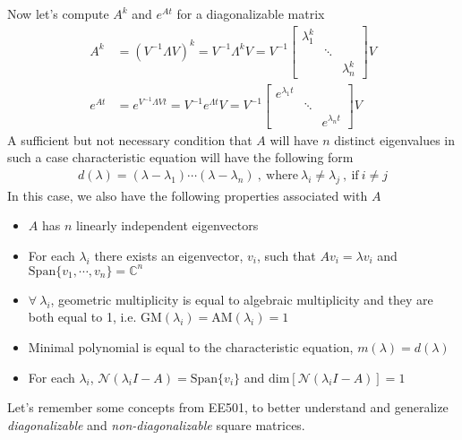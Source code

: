 \documentclass[twoside]{article}
\begin{document}
Now let's compute $A^k$ and $e^{At}$ for a diagonalizable matrix 
%
\begin{align*}
A^k &= \left(V^{-1} \Lambda V \right)^k  = V^{-1} \Lambda^k V = V^{-1} \left[ \begin{array}{ccc} \lambda_1^k &  &   \\   &  \ddots & \\ & & \lambda_n^k \end{array} \right] V
\\
e^{A t} &= e^{V^{-1} \Lambda V t}  = V^{-1} e^{ \Lambda t} V = V^{-1} \left[ \begin{array}{ccc} e^{\lambda_1 t} &  &   \\   &  \ddots & \\ & & e^{\lambda_n t} \end{array} \right] V  
\end{align*}
%
A sufficient but not necessary condition that $A$ will have $n$ distinct eigenvalues in such a case characteristic equation will have the following form
%
\begin{align*}
d(\lambda) = (\lambda - \lambda_1) \cdots (\lambda - \lambda_n) \ , \ \mathrm{where} \ \lambda_i \neq \lambda_j \ , \ \mathrm{if} \ i \neq j 
\end{align*}
% 
In this case, we also have the following properties associated with $A$
%
\begin{itemize}
	\item $A$ has $n$ linearly independent eigenvectors
	\item For each $\lambda_i$ there exists an eigenvector, $v_i$, such that $A v_i = \lambda v_i$ and $\mathrm{Span}\lbrace v_1 , \cdots , v_n \rbrace = \mathbb{C}^n$
	\item $\forall \ \lambda_i$, geometric multiplicity is equal to algebraic multiplicity and they are both equal to 1, i.e. $\mathrm{GM}(\lambda_i) = \mathrm{AM}(\lambda_i) = 1$
	\item Minimal polynomial is equal to the characteristic equation, $m(\lambda) = d(\lambda)$
	\item For each $\lambda_i$, $\mathcal{N}(\lambda_i I - A) = \mathrm{Span} \lbrace v_i \rbrace $ and $ \mathrm{dim} [ \mathcal{N}(\lambda_i I - A) ] = 1$
\end{itemize}
%
Let's remember some concepts from EE501, to better understand and generalize \textit{diagonalizable} and \textit{non-diagonalizable} square matrices.  
\end{document}
